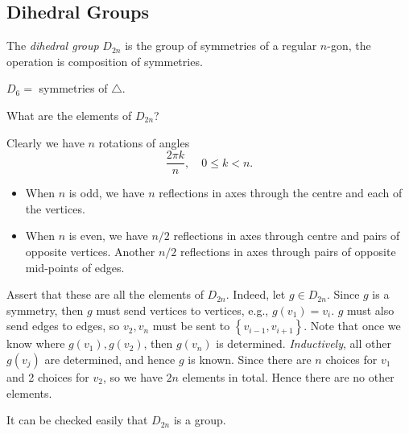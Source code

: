 \documentclass[10pt]{article}
\def\le{\leqslant}
\begin{document}
    \subsection{Dihedral Groups}
    \begin{definition}
        The \textit{dihedral group} $ D_{2n} $ is the group of symmetries of a regular $n$-gon, the operation is composition of symmetries.
    \end{definition}
    \begin{example}
        $ D_{6}= $ symmetries of $ \triangle $.
    \end{example}
    What are the elements of $ D_{2n} $?

    Clearly we have $n$ rotations of angles
    \[
        \frac{2\pi k}{n}, \quad 0\le k<n
    .\]
    \begin{itemize}
        \item When $n$ is odd, we have $n$ reflections in axes through the centre and each of the vertices.
        \item When $n$ is even, we have $ n/2 $ reflections in axes through centre and pairs of opposite vertices. Another $ n/2 $ reflections in axes through pairs of opposite mid-points of edges.
    \end{itemize}
    Assert that these are all the elements of $ D_{2n} $. Indeed, let $ g\in D_{2n} $. Since $g$ is a symmetry, then $g$ must send vertices to vertices, e.g., $ g(v_1)=v_i $. $g$ must also send edges to edges, so $ v_2,v_n $ must be sent to $ \left\{ v_{i-1},v_{i+1}\right\} $.
    Note that once we know where $g(v_1),g(v_2)$, then $g(v_n)$ is determined. \textit{Inductively}, all other $g(v_j)$ are determined, and hence $g$ is known. Since there are $ n $ choices for $v_1$ and 2 choices for $v_2$, so we have $2n$ elements in total. Hence there are no other elements.

    It can be checked easily that $D_{2n}$ is a group.
\end{document}

